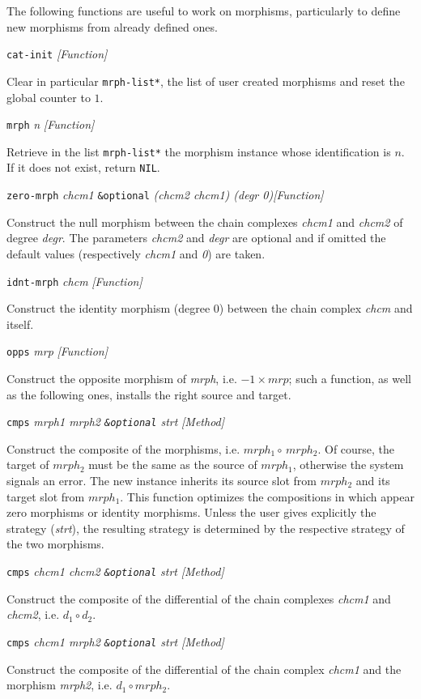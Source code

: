 The following functions are useful to work on morphisms, particularly to define
new morphisms from already defined ones.
\vskip 0.50cm
{\parindent=0mm
{\leftskip=5mm
{\tt cat-init} \hfill {\em [Function]} \par}
{\leftskip=15mm
Clear in particular {\tt *mrph-list*}, the list of user created morphisms  and reset
the global counter to $1$. \par}
{\leftskip=5mm
{\tt mrph} {\em n} \hfill {\em [Function]}\par}
{\leftskip=15mm
Retrieve in the list {\tt *mrph-list*} the morphism instance whose identification
is $n$. If it does not exist, return {\tt NIL}. \par}
{\leftskip=5mm
{\tt zero-mrph} {\em chcm1} {\tt \&optional} {\em (chcm2 chcm1) (degr 0)}\hfill {\em [Function]} \par}
{\leftskip=15mm
Construct the null morphism between the chain complexes {\em chcm1} and {\em chcm2} of degree {\em degr}.
The parameters {\em chcm2} and {\em degr} are optional and if omitted the  default values
(respectively {\em chcm1} and {\em 0}) are taken.  \par}
{\leftskip=5mm
{\tt idnt-mrph} {\em chcm} \hfill{\em [Function]}\par }
{\leftskip=15mm
Construct the identity morphism (degree $0$) between the chain complex {\em chcm} and itself. \par}
{\leftskip=5mm
{\tt opps} {\em mrp} \hfill{\em [Function]}\par }
{\leftskip=15mm
Construct the opposite morphism of {\em mrph}, i.e. $-1 \times mrp$; such a function, as well as
the following ones, installs the right source and target. \par}
{\leftskip=5mm
{\tt cmps} {\em mrph1 mrph2 {\tt \&optional} strt} \hfill{\em [Method]}\par }
{\leftskip=15mm
Construct the  composite of the morphisms, i.e. $mrph_1 \circ\, mrph_2$.
Of course, the target of $mrph_2$ must be the same as the source of $mrph_1$, otherwise the
system signals an error. The new instance  inherits
its source slot from $mrph_2$ and its target slot from $mrph_1$. This function optimizes
the compositions in which appear zero morphisms or identity morphisms. Unless the user gives explicitly
the  strategy ({\em strt}), the resulting strategy is determined by the respective strategy
of the two morphisms.\par}
{\leftskip=5mm
{\tt cmps} {\em chcm1 chcm2 {\tt \&optional} strt} \hfill{\em [Method]}\par }
{\leftskip=15mm
Construct the composite of the differential of the chain complexes {\em chcm1} and  {\em chcm2},
i.e. $d_1 \circ d_2$. \par}
{\leftskip=5mm
{\tt cmps} {\em chcm1 mrph2 {\tt \&optional} strt} \hfill{\em [Method]}\par }
{\leftskip=15mm
Construct the composite of the differential of the chain complex {\em chcm1} and the
morphism  {\em mrph2}, i.e. $d_1 \circ mrph_2$. \par}
}
